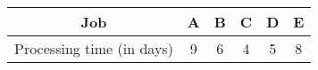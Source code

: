\begin{center}
\begin{tabular}{|c|c|c|c|c|c|}
\hline
Job & A & B & C & D & E \\
\hline
Processing time (in days) & 9 & 6 & 4 & 5 & 8 \\
\hline
\end{tabular}
\end{center}
